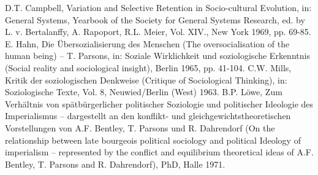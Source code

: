 \begin{thebibliography}{xxx}
 D.T. Campbell, Variation and Selective Retention in
  Socio-cultural Evolution, in: General Systems, Yearbook of the Society for
  General Systems Research, ed. by L. v. Bertalanffy, A. Rapoport, R.L. Meier,
  Vol. XIV., New York 1969, pp. 69-85.
 E. Hahn, Die Übersozialisierung des Menschen (The
  oversocialisation of the human being) -- T. Parsons, in: Soziale
  Wirklichkeit und soziologische Erkenntnis (Social reality and sociological
  insight), Berlin 1965, pp. 41-104.
 C.W. Mills, Kritik der soziologischen Denkweise (Critique
  of Sociological Thinking), in: Soziologische Texte, Vol. 8, Neuwied/Berlin
  (West) 1963.
 B.P. Löwe, Zum Verhältnis von spätbürgerlicher politischer
  Soziologie und politischer Ideologie des Imperialismus -- dargestellt an den
  konflikt- und gleichgewichtstheoretischen Vorstellungen von A.F. Bentley,
  T. Parsons und R. Dahrendorf (On the relationship between late bourgeois
  political sociology and political Ideology of imperialism -- represented by
  the conflict and equilibrium theoretical ideas of A.F. Bentley, T. Parsons
  and R. Dahrendorf), PhD, Halle 1971.
\end{thebibliography}
